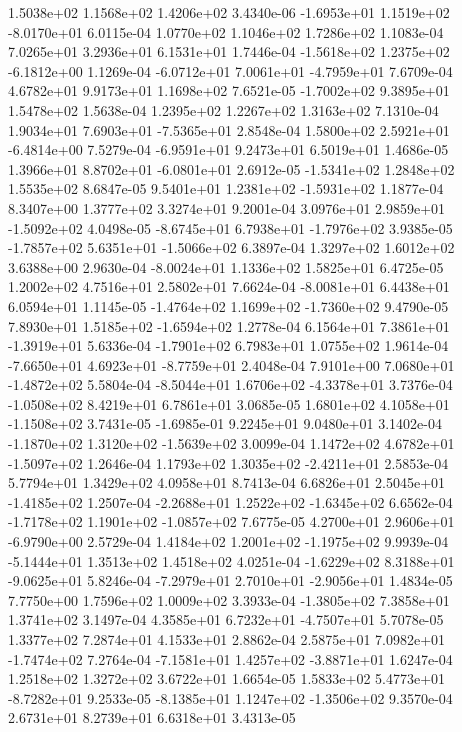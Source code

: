 1.5038e+02 1.1568e+02 1.4206e+02  3.4340e-06
-1.6953e+01  1.1519e+02 -8.0170e+01  6.0115e-04
1.0770e+02 1.1046e+02 1.7286e+02  1.1083e-04
7.0265e+01 3.2936e+01 6.1531e+01  1.7446e-04
-1.5618e+02  1.2375e+02 -6.1812e+00  1.1269e-04
-6.0712e+01  7.0061e+01 -4.7959e+01  7.6709e-04
4.6782e+01 9.9173e+01 1.1698e+02  7.6521e-05
-1.7002e+02  9.3895e+01  1.5478e+02  1.5638e-04
1.2395e+02 1.2267e+02 1.3163e+02  7.1310e-04
 1.9034e+01  7.6903e+01 -7.5365e+01  2.8548e-04
 1.5800e+02  2.5921e+01 -6.4814e+00  7.5279e-04
-6.9591e+01  9.2473e+01  6.5019e+01  1.4686e-05
 1.3966e+01  8.8702e+01 -6.0801e+01  2.6912e-05
-1.5341e+02  1.2848e+02  1.5535e+02  8.6847e-05
 9.5401e+01  1.2381e+02 -1.5931e+02  1.1877e-04
8.3407e+00 1.3777e+02 3.3274e+01  9.2001e-04
 3.0976e+01  2.9859e+01 -1.5092e+02  4.0498e-05
-8.6745e+01  6.7938e+01 -1.7976e+02  3.9385e-05
-1.7857e+02  5.6351e+01 -1.5066e+02  6.3897e-04
1.3297e+02 1.6012e+02 3.6388e+00  2.9630e-04
-8.0024e+01  1.1336e+02  1.5825e+01  6.4725e-05
1.2002e+02 4.7516e+01 2.5802e+01  7.6624e-04
-8.0081e+01  6.4438e+01  6.0594e+01  1.1145e-05
-1.4764e+02  1.1699e+02 -1.7360e+02  9.4790e-05
 7.8930e+01  1.5185e+02 -1.6594e+02  1.2778e-04
 6.1564e+01  7.3861e+01 -1.3919e+01  5.6336e-04
-1.7901e+02  6.7983e+01  1.0755e+02  1.9614e-04
-7.6650e+01  4.6923e+01 -8.7759e+01  2.4048e-04
 7.9101e+00  7.0680e+01 -1.4872e+02  5.5804e-04
-8.5044e+01  1.6706e+02 -4.3378e+01  3.7376e-04
-1.0508e+02  8.4219e+01  6.7861e+01  3.0685e-05
 1.6801e+02  4.1058e+01 -1.1508e+02  3.7431e-05
-1.6985e-01  9.2245e+01  9.0480e+01  3.1402e-04
-1.1870e+02  1.3120e+02 -1.5639e+02  3.0099e-04
 1.1472e+02  4.6782e+01 -1.5097e+02  1.2646e-04
 1.1793e+02  1.3035e+02 -2.4211e+01  2.5853e-04
5.7794e+01 1.3429e+02 4.0958e+01  8.7413e-04
 6.6826e+01  2.5045e+01 -1.4185e+02  1.2507e-04
-2.2688e+01  1.2522e+02 -1.6345e+02  6.6562e-04
-1.7178e+02  1.1901e+02 -1.0857e+02  7.6775e-05
 4.2700e+01  2.9606e+01 -6.9790e+00  2.5729e-04
 1.4184e+02  1.2001e+02 -1.1975e+02  9.9939e-04
-5.1444e+01  1.3513e+02  1.4518e+02  4.0251e-04
-1.6229e+02  8.3188e+01 -9.0625e+01  5.8246e-04
-7.2979e+01  2.7010e+01 -2.9056e+01  1.4834e-05
7.7750e+00 1.7596e+02 1.0009e+02  3.3933e-04
-1.3805e+02  7.3858e+01  1.3741e+02  3.1497e-04
 4.3585e+01  6.7232e+01 -4.7507e+01  5.7078e-05
1.3377e+02 7.2874e+01 4.1533e+01  2.8862e-04
 2.5875e+01  7.0982e+01 -1.7474e+02  7.2764e-04
-7.1581e+01  1.4257e+02 -3.8871e+01  1.6247e-04
1.2518e+02 1.3272e+02 3.6722e+01  1.6654e-05
 1.5833e+02  5.4773e+01 -8.7282e+01  9.2533e-05
-8.1385e+01  1.1247e+02 -1.3506e+02  9.3570e-04
2.6731e+01 8.2739e+01 6.6318e+01  3.4313e-05

